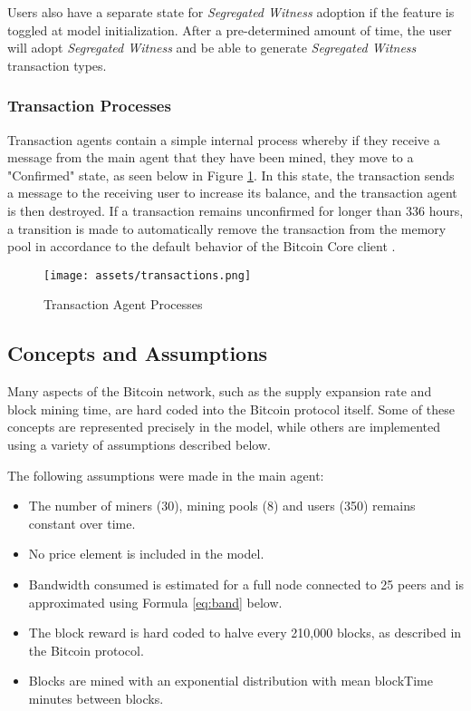\documentclass[12pt]{report}
\begin{document}
Users also have a separate state for \textit{Segregated Witness} adoption if the feature is toggled at model initialization. After a pre-determined amount of time, the user will adopt \textit{Segregated Witness} and be able to generate \textit{Segregated Witness} transaction types.

\subsubsection{Transaction Processes}
Transaction agents contain a simple internal process whereby if they receive a message from the main agent that they have been mined, they move to a "Confirmed" state, as seen below in Figure \ref{fig:tx}. In this state, the transaction sends a message to the receiving user to increase its balance, and the transaction agent is then destroyed. If a transaction remains unconfirmed for longer than 336 hours, a transition is made to automatically remove the transaction from the memory pool in accordance to the default behavior of the Bitcoin Core client \cite{BitcoinCore.}.

\begin{figure}[h!]
\begin{center}
\texttt{[image: assets/transactions.png]}
\end{center}
\caption{Transaction Agent Processes}
\label{fig:tx}
\end{figure}

\subsection{Concepts and Assumptions}
Many aspects of the Bitcoin network, such as the supply expansion rate and block mining time, are hard coded into the Bitcoin protocol itself. Some of these concepts are represented precisely in the model, while others are implemented using a variety of assumptions described below.

The following assumptions were made in the main agent:
\begin{itemize}
\item The number of miners (30), mining pools (8) and users (350) remains constant over time.
\item No price element is included in the model.
\item Bandwidth consumed is estimated for a full node connected to 25 peers and is approximated using Formula \ref{eq:band} below.
\item The block reward is hard coded to halve every 210,000 blocks, as described in the Bitcoin protocol.
\item Blocks are mined with an exponential distribution with mean blockTime minutes between blocks.%
\end{itemize}
\end{document}
